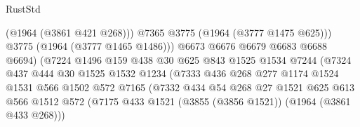 \begin{lexlean}{RustStd}
\begin{coremodule}
                                          (@1964 (@3861 @421 @268)))
                                        @7365
                                        @3775
                                        (@1964 (@3777 @1475 @625)))
                                      @3775
                                      (@1964 (@3777 @1465 @1486)))
                                    @6673
                                    @6676
                                    @6679
                                    @6683
                                    @6688
                                    @6694)
                                  (@7224
                                    @1496
                                    @159
                                    @438
                                    @30
                                    @625
                                    @843
                                    @1525
                                    @1534
                                    @7244
                                    (@7324
                                      @437
                                      @444
                                      @30
                                      @1525
                                      @1532
                                      @1234
                                      (@7333
                                        @436
                                        @268
                                        @277
                                        @1174
                                        @1524
                                        @1531
                                        @566
                                        @1502
                                        @572
                                        @7165
                                        (@7332
                                          @434
                                          @54
                                          @268
                                          @27
                                          @1521
                                          @625
                                          @613
                                          @566
                                          @1512
                                          @572
                                          (@7175
                                            @433
                                            @1521
                                            (@3855 (@3856 @1521))
                                            (@1964 (@3861 @433 @268)))

\end{coremodule}
\end{lexlean}
